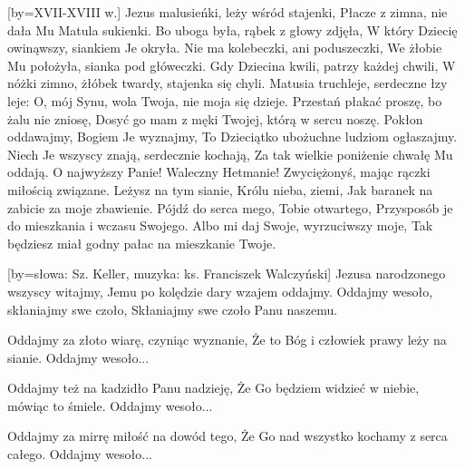 

[by={XVII-XVIII w.}]
\beginverse
    Jezus malusieńki, leży wśród stajenki,
    Płacze z zimna, nie dała Mu Matula sukienki.
\endverse
\beginverse
    Bo uboga była, rąbek z głowy zdjęła,
    W który Dziecię owinąwszy, siankiem Je okryła.
\endverse
\beginverse
    Nie ma kolebeczki, ani poduszeczki,
    We żłobie Mu położyła, sianka pod główeczki.
\endverse
\beginverse
    Gdy Dziecina kwili, patrzy każdej chwili,
    W nóżki zimno, żłóbek twardy, stajenka się chyli.
\endverse
\beginverse
    Matusia truchleje, serdeczne łzy leje:
    O, mój Synu, wola Twoja, nie moja się dzieje.
\endverse
\beginverse
    Przestań płakać proszę, bo żalu nie zniosę,
    Dosyć go mam z męki Twojej, którą w sercu noszę.
\endverse
\beginverse
    Pokłon oddawajmy, Bogiem Je wyznajmy,
    To Dzieciątko ubożuchne ludziom ogłaszajmy.
\endverse
\beginverse
    Niech Je wszyscy znają, serdecznie kochają,
    Za tak wielkie poniżenie chwałę Mu oddają.
\endverse
\beginverse
    O najwyższy Panie! Waleczny Hetmanie!
    Zwyciężonyś, mając rączki miłością związane.
\endverse
\beginverse
    Leżysz na tym sianie, Królu nieba, ziemi,
    Jak baranek na zabicie za moje zbawienie.
\endverse
\beginverse
    Pójdź do serca mego, Tobie otwartego,
    Przysposób je do mieszkania i wczasu Swojego.
\endverse
\beginverse
    Albo mi daj Swoje, wyrzuciwszy moje,
    Tak będziesz miał godny pałac na mieszkanie Twoje.
\endverse
\endsong

[by={słowa: Sz. Keller, muzyka: ks. Franciszek Walczyński}]
\beginverse
Jezusa narodzonego wszyscy witajmy,
Jemu po kolędzie dary wzajem oddajmy.
\endverse
\beginchorus
Oddajmy wesoło, skłaniajmy swe czoło,
Skłaniajmy swe czoło Panu naszemu.
\endchorus

\beginverse
Oddajmy za złoto wiarę, czyniąc wyznanie,
Że to Bóg i człowiek prawy leży na sianie.
\endverse
\beginchorus
Oddajmy wesoło...
\endchorus

\beginverse
Oddajmy też na kadzidło Panu nadzieję,
Że Go będziem widzieć w niebie, mówiąc to śmiele.
\endverse
\beginchorus
Oddajmy wesoło...
\endchorus

\beginverse
Oddajmy za mirrę miłość na dowód tego,
Że Go nad wszystko kochamy z serca całego.
\endverse
\beginchorus
Oddajmy wesoło...
\endchorus

